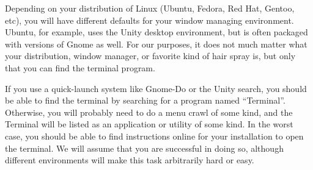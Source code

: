 


Depending on your distribution of Linux (Ubuntu, Fedora, Red Hat, Gentoo, etc), you will have different defaults for your window managing environment.
Ubuntu, for example, uses the Unity desktop environment, but is often packaged with versions of Gnome as well.
For our purposes, it does not much matter what your distribution, window manager, or favorite kind of hair spray is, but only that you can find the terminal program.

If you use a quick-launch system like Gnome-Do or the Unity search, you should be able to find the terminal by searching for a program named ``Terminal''.
Otherwise, you will probably need to do a menu crawl of some kind, and the Terminal will be listed as an application or utility of some kind.
In the worst case, you should be able to find instructions online for your installation to open the terminal.
We will assume that you are successful in doing so, although different environments will make this task arbitrarily hard or easy.



